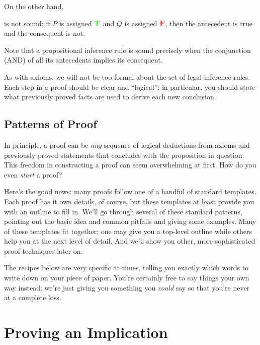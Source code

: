 On the other hand,
\begin{rul*}
\end{rul*}
\noindent is not sound: if $P$ is assigned $\textcolor{green}{\mathbf{T}}$ and $Q$ is assigned
$\textcolor{red}{\mathbf{F}}$, then the antecedent is true and the consequent is not.

Note that a propositional inference rule is sound precisely when the conjunction
(AND) of all its antecedents implies its consequent.

As with axioms, we will not be too formal about the set of legal inference
rules.  Each step in a proof should be clear and ``logical''; in
particular, you should state what previously proved facts are used to
derive each new conclusion.

\subsection{Patterns of Proof}

In principle, a proof can be \textit{any} sequence of logical
deductions from axioms and previously proved statements that concludes
with the proposition in question.  This freedom in constructing a
proof can seem overwhelming at first.  How do you even \textit{start}
a proof?

Here's the good news: many proofs follow one of a handful of standard
templates.  Each proof has it own details, of course, but these
templates at least provide you with an outline to fill in.  We'll go
through several of these standard patterns, pointing out the basic
idea and common pitfalls and giving some examples.  Many of these
templates fit together; one may give you a top-level outline while
others help you at the next level of detail.  And we'll show you
other, more sophisticated proof techniques later on.

The recipes below are very specific at times, telling you exactly
which words to write down on your piece of paper.  You're certainly
free to say things your own way instead; we're just giving you
something you \textit{could} say so that you're never at a complete
loss.


\section{Proving an Implication}
\label{sec:prove_implies}

